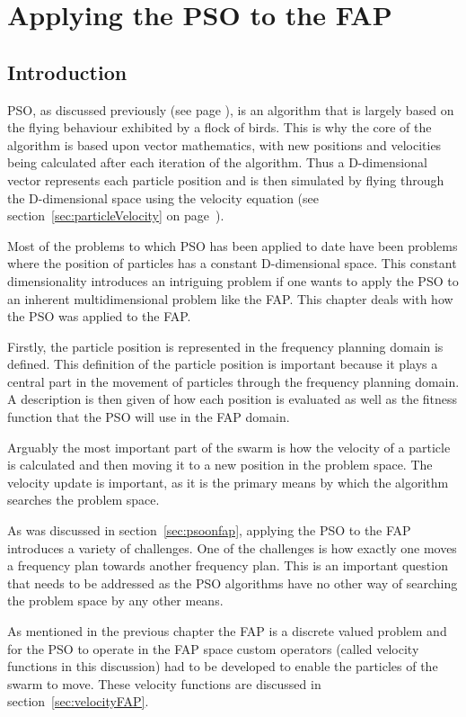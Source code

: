 \chapter{Applying the PSO to the FAP}
\label{chpt:psoapplicationFAP}
\section{Introduction}
PSO, as discussed previously (see page \pageref{sec:PSO}), is an algorithm that is largely based on the flying behaviour exhibited by a flock of birds. This is why the core of the algorithm is based upon vector mathematics, with new positions and velocities being calculated after each iteration of the algorithm. Thus a D-dimensional vector represents each particle position and is then simulated by flying through the D-dimensional space using the velocity equation (see section~\ref{sec:particleVelocity} on page~\pageref{eq:velocityupdate}).

Most of the problems to which \gls{PSO} has been applied to date have been problems where the position of particles has a constant D-dimensional space. This constant dimensionality introduces an intriguing problem if one wants to apply the \gls{PSO} to an inherent multidimensional problem like the \gls{FAP}. This chapter deals with how the \gls{PSO} was applied to the \gls{FAP}.

Firstly, the particle position is represented in the frequency planning domain is defined. This definition of the particle position is important because it plays a central part in the movement of particles through the frequency planning domain. A description is then given of how each position is evaluated as well as the fitness function that the \gls{PSO} will use in the \gls{FAP} domain.

Arguably the most important part of the swarm is how the velocity of a particle is calculated and then moving it to a new position in the problem space. The velocity update is important, as it is the primary means by which the algorithm searches the problem space.

As was discussed in section~\ref{sec:psoonfap}, applying the \gls{PSO} to the \gls{FAP} introduces a variety of challenges. One of the challenges is how exactly one moves a frequency plan towards another frequency plan. This is an important question that needs to be addressed as the \gls{PSO} algorithms have no other way of searching the problem space by any other means.

As mentioned in the previous chapter the FAP is a discrete valued problem and for the \gls{PSO} to operate in the \gls{FAP} space custom operators (called velocity functions in this discussion) had to be developed to enable the particles of the swarm to move. These velocity functions are discussed in section~\ref{sec:velocityFAP}. 

